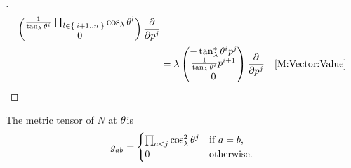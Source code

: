 \documentclass[../main.tex]{subfiles}
\begin{document}
\begin{proof}[]
\begin{align*}
\begin{pmatrix}
\frac{1}{\tan_\lambda{\tensor{\theta}{^{i}}}}\prod_{l\in\Set{i+1..n}}{\cos_\lambda{\tensor{\theta}{^l}}}\\
0\\
\end{pmatrix}
\frac{\partial}{\partial\tensor{p}{^j}}\\
&=
\lambda
\begin{pmatrix}
-\tan_\lambda^\ast\tensor{\theta}{^i}\tensor{p}{^j}\\
\frac{1}{\tan_\lambda\tensor{\theta}{^i}}\tensor{p}{^{i+1}}\\
0
\end{pmatrix}\frac{\partial}{\partial\tensor{p}{^j}}&\text{\cref{M:Vector:Value}}\qedhere\\
\end{align*}
\end{proof}
\begin{lemma}\label{M:MetricTensor}
The metric tensor of \(N\) at \(\tensor{\theta}{}\)is
\[
\tensor{g}{_a_b}=
\begin{cases}
\prod_{a<j}{\cos_\lambda^2\tensor{\theta}{^j}}&\text{if \(a=b\),}\\
0&\text{otherwise.}\\
\end{cases}
\]
\end{lemma}
\end{document}
